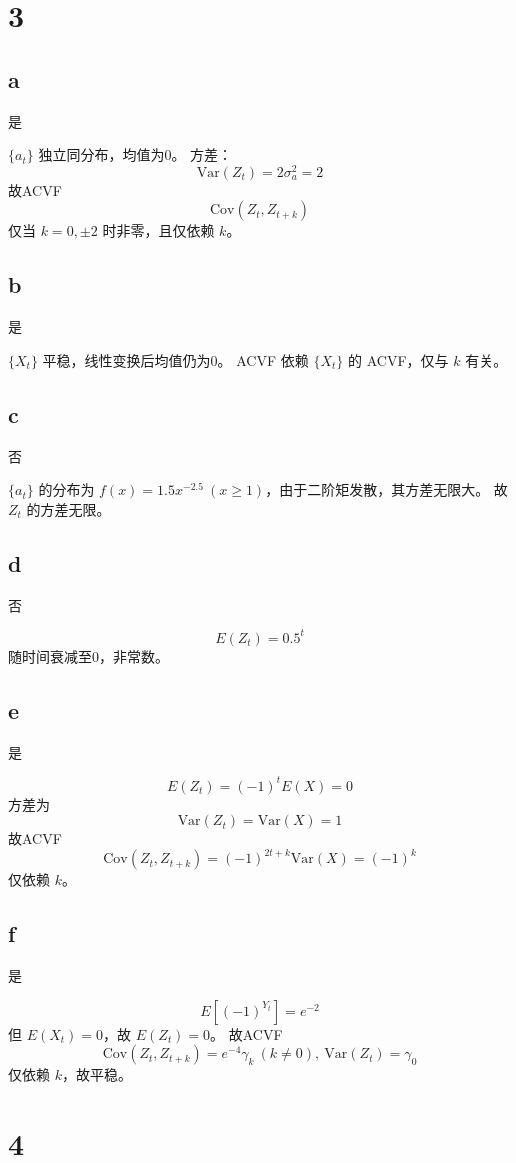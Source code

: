 \documentclass{article}
\begin{document}
\section*{3}
\subsection*{a}
是

$\{a_t\}$ 独立同分布，均值为0。
方差：
\[
\text{Var}(Z_t) = 2\sigma_a^2 = 2
\]
故ACVF
\[
\text{Cov}(Z_t, Z_{t+k})
\]
仅当 $k=0, \pm2$ 时非零，且仅依赖 $k$。

\subsection*{b}
是

$\{X_t\}$ 平稳，线性变换后均值仍为0。
ACVF 依赖 $\{X_t\}$ 的 ACVF，仅与 $k$ 有关。

\subsection*{c}
否

$\{a_t\}$ 的分布为 $f(x) = 1.5x^{-2.5} \ (x \geq 1)$，由于二阶矩发散，其方差无限大。
故 $Z_t$ 的方差无限。

\subsection*{d}
否

\[
E(Z_t) = 0.5^t
\]
随时间衰减至0，非常数。

\subsection*{e}
是

\[
E(Z_t) = (-1)^t E(X) = 0
\]
方差为
\[
\text{Var}(Z_t) = \text{Var}(X) = 1
\]
故ACVF
\[
\text{Cov}(Z_t, Z_{t+k}) = (-1)^{2t+k} \text{Var}(X) = (-1)^k
\]
仅依赖 $k$。

\subsection*{f}
是

\[
E[(-1)^{Y_t}] = e^{-2}
\]
但 $E(X_t) = 0$，故 $E(Z_t) = 0$。
故ACVF
\[
\text{Cov}(Z_t, Z_{t+k}) = e^{-4} \gamma_k \ (k \neq 0), \ \text{Var}(Z_t) = \gamma_0
\]
仅依赖 $k$，故平稳。

\section*{4}
\end{document}
